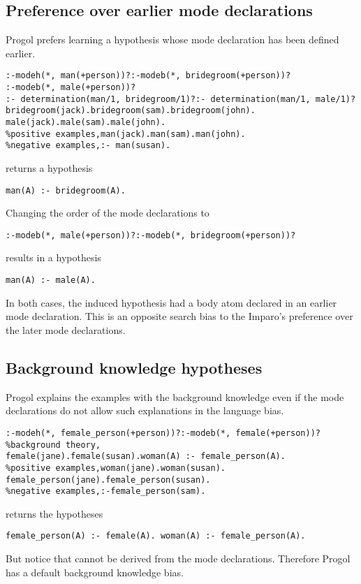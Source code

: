 \subsection{Preference over earlier mode declarations}
Progol prefers learning a hypothesis whose mode declaration has been defined earlier.

\begin{lstlisting}
:-modeh(*, man(+person))?:-modeb(*, bridegroom(+person))?
:-modeb(*, male(+person))?
:- determination(man/1, bridegroom/1)?:- determination(man/1, male/1)?
bridegroom(jack).bridegroom(sam).bridegroom(john).
male(jack).male(sam).male(john).
%positive examples,man(jack).man(sam).man(john).
%negative examples,:- man(susan).
\end{lstlisting}

returns a hypothesis
\begin{lstlisting}
man(A) :- bridegroom(A).
\end{lstlisting}

Changing the order of the mode declarations to
\begin{lstlisting}
:-modeb(*, male(+person))?:-modeb(*, bridegroom(+person))?
\end{lstlisting}
results in a hypothesis
\begin{lstlisting}
man(A) :- male(A).
\end{lstlisting}
In both cases, the induced hypothesis had a body atom declared in an earlier mode declaration. This is an opposite search bias to the Imparo's preference over the later mode declarations.

\subsection{Background knowledge hypotheses}
Progol explains the examples with the background knowledge even if the mode declarations do not allow such explanations in the language bias.

\begin{lstlisting}
:-modeh(*, female_person(+person))?:-modeb(*, female(+person))?
%background theory,
female(jane).female(susan).woman(A) :- female_person(A).
%positive examples,woman(jane).woman(susan).
female_person(jane).female_person(susan).
%negative examples,:-female_person(sam).
\end{lstlisting}
returns the hypotheses
\begin{lstlisting}
female_person(A) :- female(A). woman(A) :- female_person(A).
\end{lstlisting}
But notice that  cannot be derived from the mode declarations. Therefore Progol has a default background knowledge bias.

